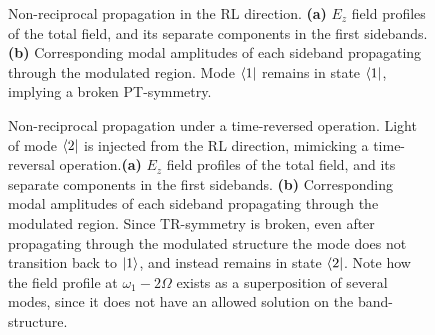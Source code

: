 \begin{figure}[t!]
	\centering
	\setlength{\figH}{1\textwidth}
	\setlength{\figW}{1\textwidth}   
	
	\caption[Modal field profiles at each sideband $n$ for the right-to-left direction]{Non-reciprocal propagation in the RL direction. \textbf{(a)} $E_z$ field profiles of the total field, and its separate components in the first sidebands. \textbf{(b)} Corresponding modal amplitudes of each sideband propagating through the modulated region. Mode $\bra{1}$ remains in state $\bra{1}$, implying a broken PT-symmetry.}
	\label{fig:RLFang}
\end{figure}

\begin{figure}[t!]
	\centering
	\setlength{\figH}{\textwidth}
	\setlength{\figW}{1\textwidth}
	
	\caption[Broken time-reversal symmetry in the photonic AB waveguide.]{Non-reciprocal propagation under a time-reversed operation. Light of mode $\bra{2}$ is injected from the RL direction, mimicking a time-reversal operation.\textbf{(a)} $E_z$ field profiles of the total field, and its separate components in the first sidebands. \textbf{(b)} Corresponding modal amplitudes of each sideband propagating through the modulated region. Since TR-symmetry is broken, even after propagating through the modulated structure the mode does not transition back to $\ket{1}$, and instead remains in state $\bra{2}$. Note how the field profile at $\omega_1-2\Omega$ exists as a superposition of several modes, since it does not have an allowed solution on the band-structure.}
	\label{fig:TRFang}
\end{figure}   
\clearpage

